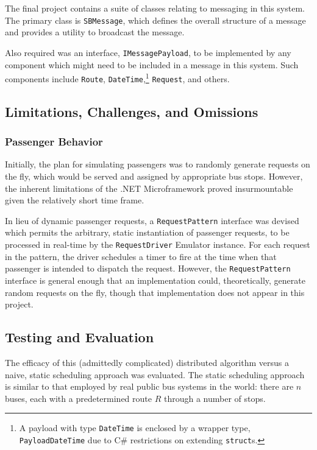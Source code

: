 \documentclass[runningheads]{llncs}
\begin{document}
The final project contains a suite of classes relating to messaging in this system. The primary class is \lstinline{SBMessage}, which defines the overall structure of a message and provides a utility to broadcast the message.

Also required was an interface, \lstinline{IMessagePayload}, to be implemented by any component which might need to be included in a message in this system. Such components include \lstinline{Route}, \lstinline{DateTime},\footnote{A payload with type \lstinline|DateTime| is enclosed by a wrapper type, \lstinline|PayloadDateTime| due to C\# restrictions on extending \lstinline|struct|s.} \lstinline{Request}, and others.


\subsection{Limitations, Challenges, and Omissions}
\subsubsection{Passenger Behavior}
\label{sub:passengers}
Initially, the plan for simulating passengers was to randomly generate requests on the fly, which would be served and assigned by appropriate bus stops. However, the inherent limitations of the .NET Microframework proved insurmountable given the relatively short time frame.

In lieu of dynamic passenger requests, a \lstinline{RequestPattern} interface was devised which permits the arbitrary, static instantiation of passenger requests, to be processed in real-time by the \lstinline{RequestDriver} Emulator instance. For each request in the pattern, the driver schedules a timer to fire at the time when that passenger is intended to dispatch the request. However, the \lstinline{RequestPattern} interface is general enough that an implementation could, theoretically, generate random requests on the fly, though that implementation does not appear in this project.

\subsection{Testing and Evaluation}
The efficacy of this (admittedly complicated) distributed algorithm versus a naive, static scheduling approach was evaluated. The static scheduling approach is similar to that employed by real public bus systems in the world: there are $n$ buses, each with a predetermined route $R$ through a number of stops.
\end{document}
